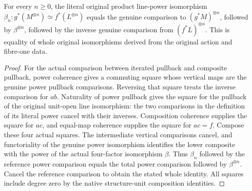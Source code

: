 \begin{theorem}\label{thm:native-tc-literal-product-power-coherence}
\leanok
{}
For every $n\geq0$, the literal original product line-power
isomorphism $\beta_n:g^*(M^{\otimes n})\simeq f^*(L^{\otimes n})$
equals the genuine comparison to $(g^*M)^{\otimes n}$, followed
by $\beta^{\otimes n}$, followed by the inverse genuine comparison
from $(f^*L)^{\otimes n}$. This is equality of whole original
isomorphisms derived from the original action and fibre-one data.
\end{theorem}
\begin{proof}
For the actual comparison between iterated pullback and composite
pullback, power coherence gives a commuting square whose vertical
maps are the genuine power pullback comparisons. Reversing that
square treats the inverse comparison for $ab$. Naturality of power
pullback gives the square for the pullback of the original
unit-open line isomorphism: the two comparisons in the definition
of its literal power cancel with their inverses. Composition
coherence supplies the square for $ac$, and equal-map coherence
supplies the square for $ac=f$. Compose these four actual squares.
The intermediate vertical comparisons cancel, and functoriality
of the genuine power isomorphism identifies the lower composite
with the power of the actual four-factor isomorphism $\beta$.
Thus $\beta_n$ followed by the reference power comparison equals
the total power comparison followed by $\beta^{\otimes n}$.
Cancel the reference comparison to obtain the stated whole
identity. All squares include degree zero by the native
structure-unit composition identities.
\end{proof}

